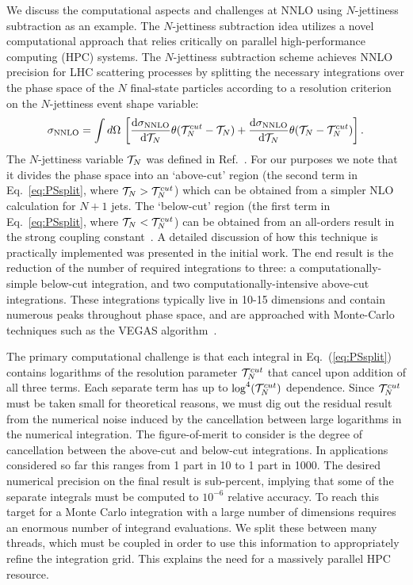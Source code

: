 \documentclass{article}
\begin{document}
We discuss the computational aspects and challenges at NNLO using $N$-jettiness subtraction as an example.  The $N$-jettiness subtraction idea utilizes a novel computational approach that relies critically on parallel high-performance computing (HPC) systems.  The $N$-jettiness subtraction scheme achieves NNLO precision for LHC scattering processes by splitting the necessary integrations over the phase space of the $N$ final-state particles according to a resolution criterion on the $N$-jettiness event shape variable:
%
\begin{equation} \label{eq:PSsplit} 
\sigma_{{\rm NNLO}}=\int d\Omega \, \left[ \frac{{\rm d}\sigma_{{\rm NNLO}}}{{\rm d} {\cal T}_N} 
	\theta({\cal T}_N^{cut}-{\cal T}_N)
	+ \frac{{\rm d}\sigma_{{\rm NNLO}}}{{\rm d} {\cal T}_N} \theta({\cal T}_N-{\cal T}_N^{cut}) \right].
\end{equation} 
%
The $N$-jettiness variable ${\cal T}_N$ was defined in Ref.~\cite{Stewart:2010tn}.  For our purposes we note that it divides the phase space into an `above-cut' region (the second term in Eq.~\ref{eq:PSsplit}, where ${\cal T}_N>{\cal T}_N^{cut}$) which can be obtained from a simpler NLO calculation for $N+1$ jets.  The `below-cut' region (the first term in Eq.~\ref{eq:PSsplit}, where ${\cal T}_N<{\cal T}_N^{cut}$) can be obtained from an all-orders result in the strong coupling constant~\cite{Stewart:2009yx}.  A detailed discussion of how this technique is practically implemented was presented in the initial work.  The end result is the reduction of the number of required integrations to three: a computationally-simple below-cut integration, and two computationally-intensive above-cut integrations.  These integrations typically live in 10-15 dimensions and contain numerous peaks throughout phase space, and are approached with Monte-Carlo techniques such as the VEGAS algorithm~\cite{Lepage:1977sw}.

The primary computational challenge is that each integral in Eq.~(\ref{eq:PSsplit}) contains logarithms of the resolution 
parameter ${\cal T}_N^{cut}$ that cancel upon addition of all three terms.  Each separate term has up to ${\rm log}^4 ({\cal T}_N^{cut})$ dependence.  Since ${\cal T}_N^{cut}$ must be taken small for theoretical reasons, we must dig out the residual result from the numerical noise induced by the cancellation between large logarithms in the numerical integration.  The figure-of-merit to consider is the degree of cancellation between the above-cut and below-cut integrations.  In applications considered so far this ranges from 1 part in 10 to 1 part in 1000.   The desired numerical precision on the final result is sub-percent, implying that some of the separate integrals must be computed to $10^{-6}$ relative accuracy.  To reach this target for a Monte Carlo integration with a large number of dimensions requires an enormous number of integrand evaluations.  We split these between many threads, which must be coupled in order to use this information to appropriately refine the integration grid.  This explains the need for a massively parallel HPC resource.
\end{document}
